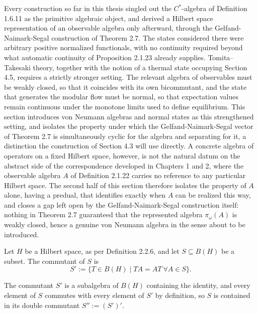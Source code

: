 Every construction so far in this thesis singled out the $C^*$-algebra
of Definition 1.6.11 as the primitive algebraic object, and derived a
Hilbert space representation of an observable algebra only afterward,
through the Gelfand-Naimark-Segal construction of Theorem 2.7. The
states considered there were arbitrary positive normalized functionals,
with no continuity required beyond what automatic continuity of
Proposition 2.1.23 already supplies. Tomita--Takesaki theory, together
with the notion of a thermal state occupying Section 4.5, requires a
strictly stronger setting. The relevant algebra of observables must be
weakly closed, so that it coincides with its own bicommutant, and the
state that generates the modular flow must be normal, so that
expectation values remain continuous under the monotone limits used to
define equilibrium. This section introduces von Neumann algebras and
normal states as this strengthened setting, and isolates the property
under which the Gelfand-Naimark-Segal vector of Theorem 2.7 is
simultaneously cyclic for the algebra and separating for it, a
distinction the construction of Section 4.3 will use directly. A
concrete algebra of operators on a fixed Hilbert space, however, is not
the natural datum on the abstract side of the correspondence developed
in Chapters 1 and 2, where the observable algebra $A$ of Definition
2.1.22 carries no reference to any particular Hilbert space. The second
half of this section therefore isolates the property of $A$ alone,
having a predual, that identifies exactly when $A$ can be realized this
way, and closes a gap left open by the Gelfand-Naimark-Segal
construction itself: nothing in Theorem 2.7 guaranteed that the
represented algebra $\pi_\omega(A)$ is weakly closed, hence a genuine
von Neumann algebra in the sense about to be introduced.

\begin{definition}[Commutant]\label{def:commutant}
	Let $H$ be a Hilbert space, as per Definition 2.2.6, and let
	$S \subseteq B(H)$ be a subset. The commutant of $S$ is
	\[
	S' := \{T \in B(H) \mid TA = AT \ \forall A \in S\}.
	\]
\end{definition}

\begin{remark}
	The commutant $S'$ is a subalgebra of $B(H)$ containing the identity,
	and every element of $S$ commutes with every element of $S'$ by
	definition, so $S$ is contained in its double commutant $S'' := (S')'$.
\end{remark}

